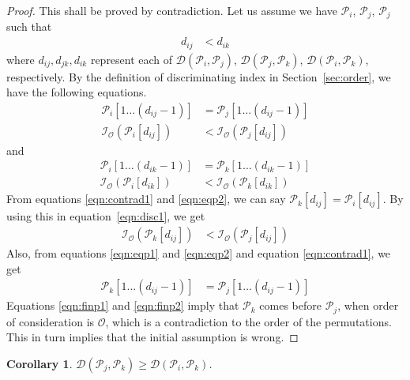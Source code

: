 \documentclass{article}
\newtheorem{corollary}[defn]{Corollary}
\begin{document}
\begin{proof}
 This shall be proved by contradiction. Let us assume we have $\mathcal{P}_{i}$, $\mathcal{P}_j$, $\mathcal{P}_{j}$ such that
\begin{align}
d_{ij} &< d_{ik} \label{eqn:contrad1}
\end{align}
where $d_{ij}, d_{jk}, d_{ik}$ represent each of $\mathcal{D}(\mathcal{P}_{i},\mathcal{P}_j)$, $\mathcal{D}(\mathcal{P}_{j},\mathcal{P}_{k})$, $\mathcal{D}(\mathcal{P}_{i},\mathcal{P}_{k})$, respectively. By the definition of discriminating index in Section~\ref{sec:order}, we have the following equations.
\begin{align}
\mathcal{P}_{i}[1 \ldots (d_{ij} - 1)] &= \mathcal{P}_{j}[1 \ldots (d_{ij} - 1)] \label{eqn:eqp1} \\
\mathcal{I}_{\mathcal{O}}(\mathcal{P}_{i}[d_{ij}]) &< \mathcal{I}_{\mathcal{O}}(\mathcal{P}_j[d_{ij}]) \label{eqn:disc1}
\end{align}
and
\begin{align}
\mathcal{P}_{i}[1 \ldots (d_{ik} - 1)] &= \mathcal{P}_{k}[1 \ldots (d_{ik} - 1)] \label{eqn:eqp2} \\
\mathcal{I}_{\mathcal{O}}(\mathcal{P}_{i}[d_{ik}]) &< \mathcal{I}_{\mathcal{O}}(\mathcal{P}_{k}[d_{ik}])
\end{align}
From equations \ref{eqn:contrad1} and \ref{eqn:eqp2},  we can say $\mathcal{P}_{k}[d_{ij}] = \mathcal{P}_{i}[d_{ij}]$. By using this in equation~\ref{eqn:disc1}, we get
\begin{align}
\mathcal{I}_{\mathcal{O}}(\mathcal{P}_{k}[d_{ij}]) &< \mathcal{I}_{\mathcal{O}}(\mathcal{P}_j[d_{ij}]) \label{eqn:finp1}
\end{align}
Also, from equations \ref{eqn:eqp1} and \ref{eqn:eqp2} and equation \ref{eqn:contrad1}, we get
\begin{align}
\mathcal{P}_{k}[1 \ldots (d_{ij} - 1)] &= \mathcal{P}_{j}[1 \ldots (d_{ij} - 1)]  \label{eqn:finp2}
\end{align}
Equations \ref{eqn:finp1} and \ref{eqn:finp2} imply that $\mathcal{P}_{k}$ comes before $\mathcal{P}_{j}$, when order of consideration is $\mathcal{O}$, which is a contradiction to the order of the permutations. This in turn implies that the initial assumption is wrong. \end{proof}

\begin{corollary}
\label{corr:disc}
$\mathcal{D}(\mathcal{P}_{j},\mathcal{P}_k) \ge \mathcal{D}(\mathcal{P}_{i},\mathcal{P}_{k})$.
\end{corollary}
\end{document}
